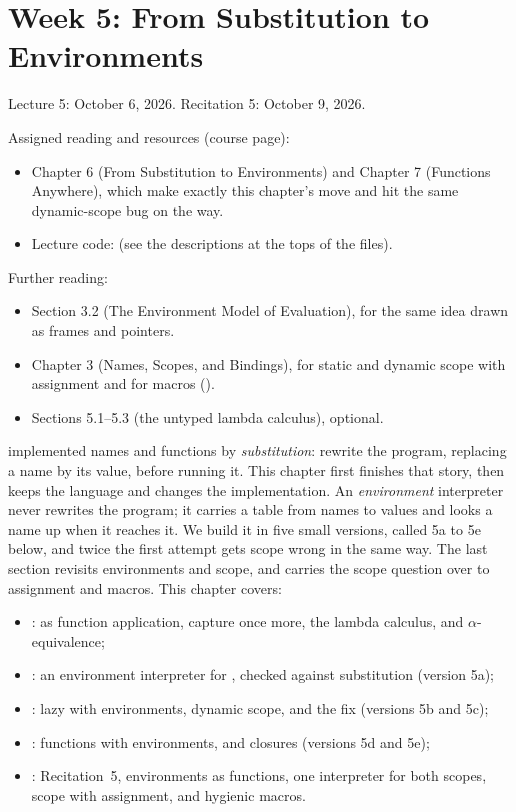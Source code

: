 \chapter{Week 5: From Substitution to Environments}
\label{ch:week5}

Lecture 5: October 6, 2026. Recitation 5: October 9, 2026.

Assigned reading and resources (course page):
\begin{itemize}
  \item \cite{PLAI} Chapter 6 (From Substitution to Environments) and Chapter 7 (Functions Anywhere), which make exactly this chapter's move and hit the same dynamic-scope bug on the way.
  \item Lecture code:  (see the descriptions at the tops of the files).
\end{itemize}

Further reading:
\begin{itemize}
  \item \cite{SICP} Section 3.2 (The Environment Model of Evaluation), for the same idea drawn as frames and pointers.
  \item \cite{Scott} Chapter 3 (Names, Scopes, and Bindings), for static and dynamic scope with assignment and for macros ().
  \item \cite{TAPL} Sections 5.1--5.3 (the untyped lambda calculus), optional.
\end{itemize}

 implemented names and functions by \emph{substitution}: rewrite the program, replacing a name by its value, before running it. This chapter first finishes that story, then keeps the language and changes the implementation. An \emph{environment} interpreter never rewrites the program; it carries a table from names to values and looks a name up when it reaches it. We build it in five small versions, called 5a to 5e below, and twice the first attempt gets scope wrong in the same way. The last section revisits environments and scope, and carries the scope question over to assignment and macros. This chapter covers:
\begin{itemize}
  \item {}:  as function application, capture once more, the lambda calculus, and $\alpha$-equivalence;
  \item {}: an environment interpreter for , checked against substitution (version 5a);
  \item {}: lazy  with environments, dynamic scope, and the fix (versions 5b and 5c);
  \item {}: functions with environments, and closures (versions 5d and 5e);
  \item {}: Recitation~5, environments as functions, one interpreter for both scopes, scope with assignment, and hygienic macros.
\end{itemize}






